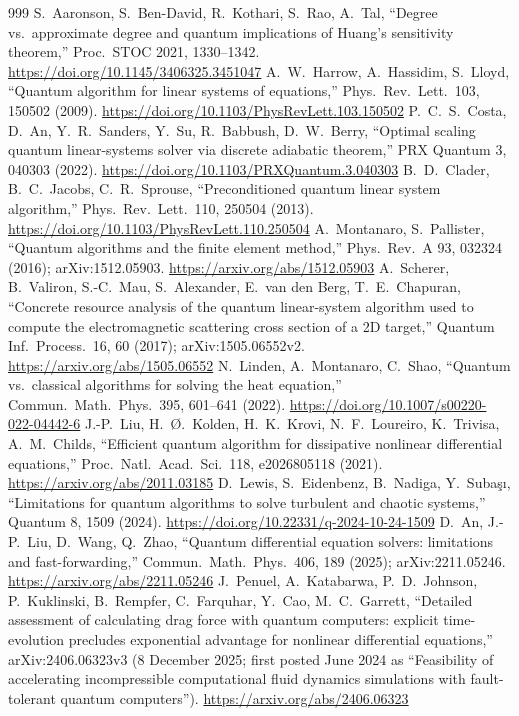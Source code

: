 \begin{thebibliography}{999}
 S.~Aaronson, S.~Ben-David, R.~Kothari, S.~Rao, A.~Tal, ``Degree vs.\ approximate degree and quantum implications of Huang's sensitivity theorem,'' Proc.\ STOC 2021, 1330--1342. \url{https://doi.org/10.1145/3406325.3451047}
 A.~W.~Harrow, A.~Hassidim, S.~Lloyd, ``Quantum algorithm for linear systems of equations,'' Phys.\ Rev.\ Lett.\ 103, 150502 (2009). \url{https://doi.org/10.1103/PhysRevLett.103.150502}
 P.~C.~S.~Costa, D.~An, Y.~R.~Sanders, Y.~Su, R.~Babbush, D.~W.~Berry, ``Optimal scaling quantum linear-systems solver via discrete adiabatic theorem,'' PRX Quantum 3, 040303 (2022). \url{https://doi.org/10.1103/PRXQuantum.3.040303}
 B.~D.~Clader, B.~C.~Jacobs, C.~R.~Sprouse, ``Preconditioned quantum linear system algorithm,'' Phys.\ Rev.\ Lett.\ 110, 250504 (2013). \url{https://doi.org/10.1103/PhysRevLett.110.250504}
 A.~Montanaro, S.~Pallister, ``Quantum algorithms and the finite element method,'' Phys.\ Rev.\ A 93, 032324 (2016); arXiv:1512.05903. \url{https://arxiv.org/abs/1512.05903}
 A.~Scherer, B.~Valiron, S.-C.~Mau, S.~Alexander, E.~van den Berg, T.~E.~Chapuran, ``Concrete resource analysis of the quantum linear-system algorithm used to compute the electromagnetic scattering cross section of a 2D target,'' Quantum Inf.\ Process.\ 16, 60 (2017); arXiv:1505.06552v2. \url{https://arxiv.org/abs/1505.06552}
 N.~Linden, A.~Montanaro, C.~Shao, ``Quantum vs.\ classical algorithms for solving the heat equation,'' Commun.\ Math.\ Phys.\ 395, 601--641 (2022). \url{https://doi.org/10.1007/s00220-022-04442-6}
 J.-P.~Liu, H.~{\O}.~Kolden, H.~K.~Krovi, N.~F.~Loureiro, K.~Trivisa, A.~M.~Childs, ``Efficient quantum algorithm for dissipative nonlinear differential equations,'' Proc.\ Natl.\ Acad.\ Sci.\ 118, e2026805118 (2021). \url{https://arxiv.org/abs/2011.03185}
 D.~Lewis, S.~Eidenbenz, B.~Nadiga, Y.~Suba\c{s}{\i}, ``Limitations for quantum algorithms to solve turbulent and chaotic systems,'' Quantum 8, 1509 (2024). \url{https://doi.org/10.22331/q-2024-10-24-1509}
 D.~An, J.-P.~Liu, D.~Wang, Q.~Zhao, ``Quantum differential equation solvers: limitations and fast-forwarding,'' Commun.\ Math.\ Phys.\ 406, 189 (2025); arXiv:2211.05246. \url{https://arxiv.org/abs/2211.05246}
 J.~Penuel, A.~Katabarwa, P.~D.~Johnson, P.~Kuklinski, B.~Rempfer, C.~Farquhar, Y.~Cao, M.~C.~Garrett, ``Detailed assessment of calculating drag force with quantum computers: explicit time-evolution precludes exponential advantage for nonlinear differential equations,'' arXiv:2406.06323v3 (8 December 2025; first posted June 2024 as ``Feasibility of accelerating incompressible computational fluid dynamics simulations with fault-tolerant quantum computers''). \url{https://arxiv.org/abs/2406.06323}

\end{thebibliography}
